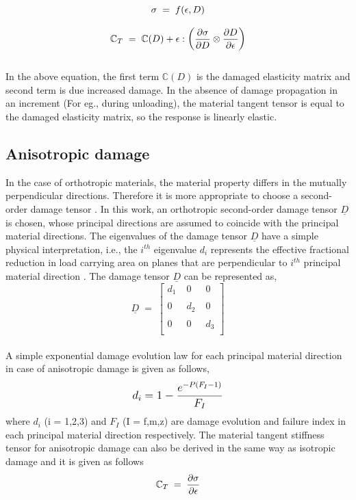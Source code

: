 \documentclass[12pt,a4paper,twoside,openright]{report}
\begin{document}
\begin{equation*}
\large{\sigma  \; = \; f(\epsilon, D) }
\end{equation*}

\begin{equation}
\large{\mathbb{C}_{T}  \; = \; \mathbb{C}(D) + \epsilon : \Big(\frac{\partial \sigma }{\partial D} \otimes \frac{\partial D}{\partial \epsilon}  \Big)    }
\end{equation}
\\
In the above equation, the first term $\mathbb{C}(D)$ is the damaged elasticity matrix and second term is due increased damage. In the absence of damage propagation in an increment (For eg., during unloading), the material tangent tensor is equal to the damaged elasticity matrix, so the response is linearly elastic.
\subsection{Anisotropic damage}
\indent\indent\indent In the case of orthotropic materials, the material property differs in the mutually perpendicular directions. Therefore it is more appropriate to choose a second-order damage tensor \citep{murakami2012continuum}. In this work, an orthotropic second-order damage tensor $\underline{D}$ is chosen, whose principal directions are assumed to coincide with the principal material directions. The eigenvalues of the damage tensor $\underline{D}$ have a simple physical interpretation, i.e., the $i^{th}$ eigenvalue $d_{i}$ represents the effective fractional reduction in load carrying area on planes that are perpendicular to $i^{th}$ principal material direction \citep{wang2009three}. The damage tensor $\underline{D}$ can be represented as,
\\
$$
\underline{D} \; = \; 
 \begin{bmatrix}
  d_{1}  \;& 0  \; & 0  \\
  \\
  0 \; & d_{2} \; & 0  \\
  \\  
  0 \; & 0 \; & d_{3} \\
  
 \end{bmatrix}
 $$  
\\
A simple exponential damage evolution law \citep{wang2009three} for each principal material direction in case of anisotropic damage is given as follows,
\begin{equation}
\mathlarger{d_{i} = 1 - \frac{e^{-P(F_{I} - 1)} }{F_{I}} } 
\label{exponential damage equation}
\end{equation}
where $d_{i}$ (i = 1,2,3) and $F_{I}$ (I = f,m,z) are damage evolution and failure index in each principal material direction respectively.
The material tangent stiffness tensor for anisotropic damage \citep{lapczyk2007progressive} can also be derived in the same way as isotropic damage and it is given as follows
\begin{equation*}
\large{ \mathbb{C}_{T}  \; = \;\frac{\partial \sigma}{\partial \epsilon}  }
\end{equation*}
\end{document}
